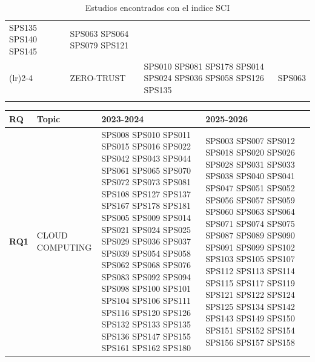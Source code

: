 \begin{table}[htbp]
\begin{tabularx}{\textwidth}{p{0.8cm}p{2.5cm}>{\raggedright\arraybackslash}X>{\raggedright\arraybackslash}X}
																		 SPS135 SPS140 SPS145             			& SPS063 SPS064 SPS079 SPS121             						\\ 
		\addlinespace[0.3em]
		\cmidrule(lr){2-4}
											 & ZERO-TRUST         	   & SPS010 SPS081 SPS178	SPS014 SPS024 SPS036 
																		 SPS058 SPS126 SPS135             			& SPS063             											 \\
		\bottomrule
		\vspace{2pt}
	\end{tabularx}
	\caption{Estudios encontrados con el indice SCI}\label{table:highest_SCI}
\end{table}

\begin{table}[htbp]
	\centering
	\setlength{\tabcolsep}{2pt}
	\tiny
	\begin{tabularx}{\textwidth}{p{0.8cm}p{2.5cm}>{\raggedright\arraybackslash}X>{\raggedright\arraybackslash}X>{\raggedright\arraybackslash}X}
		\toprule
		\textbf{RQ}                          & \textbf{Topic}       & \textbf{2023-2024}                         	& \textbf{2025-2026}             			\\
		\midrule
		\multirow{0}{*}[-10em]{\textbf{RQ1}}  & CLOUD COMPUTING 	& SPS008 SPS010 SPS011 SPS015 SPS016 SPS022 
																	  SPS042 SPS043 SPS044 SPS061 SPS065 SPS070 
																	  SPS072 SPS073 SPS081 SPS108 SPS127 SPS137 
																	  SPS167 SPS178 SPS181	SPS005 SPS009 SPS014 
																	  SPS021 SPS024 SPS025 SPS029 SPS036 SPS037 
																	  SPS039 SPS054 SPS058 SPS062 SPS068 SPS076 
																	  SPS083 SPS092 SPS094 SPS098 SPS100 SPS101 
																	  SPS104 SPS106 SPS111 SPS116 SPS120 SPS126 
																	  SPS132 SPS133 SPS135 SPS136 SPS147 SPS155 
																	  SPS161 SPS162 SPS180                         & SPS003 SPS007 SPS012 SPS018 SPS020 SPS026 
																													 SPS028 SPS031 SPS033 SPS038 SPS040 SPS041 
																													 SPS047 SPS051 SPS052 SPS056 SPS057 SPS059 
																													 SPS060 SPS063 SPS064 SPS071 SPS074 SPS075 
																													 SPS087 SPS089 SPS090 SPS091 SPS099 SPS102 
																													 SPS103 SPS105 SPS107 SPS112 SPS113 SPS114 
																													 SPS115 SPS117 SPS119 SPS121 SPS122 SPS124 
																													 SPS125 SPS134 SPS142 SPS143 SPS149 SPS150 
																													 SPS151 SPS152 SPS154 SPS156 SPS157 SPS158 

\end{tabularx}
\end{table}
